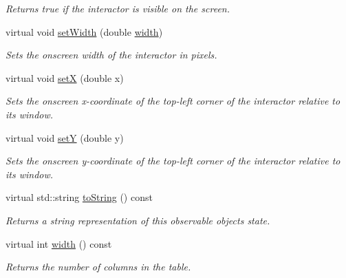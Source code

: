 \begin{DoxyCompactItemize}
\begin{DoxyCompactList}\small\item\em Returns true if the interactor is visible on the screen. \end{DoxyCompactList}\item 
virtual void \mbox{\hyperlink{classGInteractor_aa3f3fba4cb131baa8696ba01e3bceca1}{set\+Width}} (double \mbox{\hyperlink{classGTable_ad72663daf610f2a0833a2fc3d78e4fdf}{width}})
\begin{DoxyCompactList}\small\item\em Sets the onscreen width of the interactor in pixels. \end{DoxyCompactList}\item 
virtual void \mbox{\hyperlink{classGInteractor_a9c18fcc579333bf9653d13ad2b372e39}{setX}} (double x)
\begin{DoxyCompactList}\small\item\em Sets the onscreen x-\/coordinate of the top-\/left corner of the interactor relative to its window. \end{DoxyCompactList}\item 
virtual void \mbox{\hyperlink{classGInteractor_a7d57e2a5c35d27feb58fd498a3cf82b9}{setY}} (double y)
\begin{DoxyCompactList}\small\item\em Sets the onscreen y-\/coordinate of the top-\/left corner of the interactor relative to its window. \end{DoxyCompactList}\item 
virtual std\+::string \mbox{\hyperlink{classGObservable_a1fe5121d6528fdea3f243321b3fa3a49}{to\+String}} () const
\begin{DoxyCompactList}\small\item\em Returns a string representation of this observable object\textquotesingle{}s state. \end{DoxyCompactList}\item 
virtual int \mbox{\hyperlink{classGTable_ad72663daf610f2a0833a2fc3d78e4fdf}{width}} () const
\begin{DoxyCompactList}\small\item\em Returns the number of columns in the table. \end{DoxyCompactList}\end{DoxyCompactItemize}
